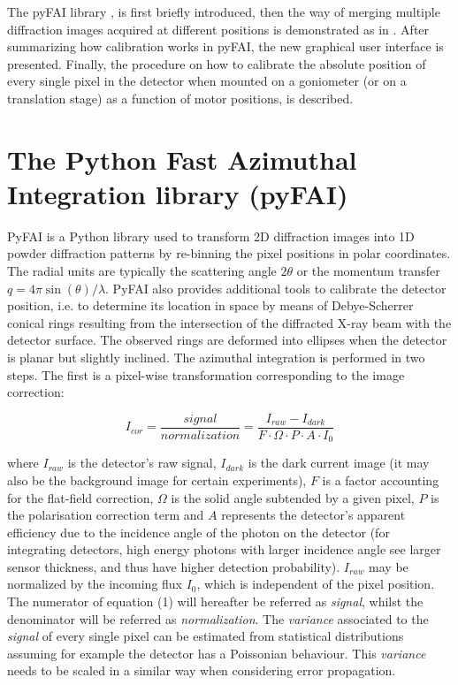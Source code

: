 \documentclass[preprint]{iucr}              %
\begin{document}
The pyFAI library \cite{fv5028}, is first briefly introduced, 
then the way of merging multiple diffraction images
acquired at different positions is demonstrated as in \cite{PyFAI_PDJ}. 
After summarizing how calibration works in pyFAI, the new graphical user
interface is presented.
Finally, the procedure on how to calibrate the absolute position of
every single pixel in the detector when mounted on a goniometer (or on a
translation stage) as a function of motor positions, is
described.

\section{The Python Fast Azimuthal Integration library (pyFAI)}

PyFAI is a Python \cite{python} library used to transform 2D diffraction images into
1D powder diffraction patterns by re-binning the pixel positions in polar
coordinates. 
The radial units are typically the scattering angle  
$2\theta$ or the momentum transfer $q=4\pi \sin(\theta)/\lambda$.
PyFAI also provides additional tools to calibrate the detector position, i.e.
to determine its location in space by means of Debye-Scherrer conical rings
resulting from the intersection of the diffracted X-ray beam with the
detector surface. 
The observed rings are deformed into ellipses when the detector is planar but 
slightly inclined. 
The azimuthal integration is performed in two steps. 
The first is a pixel-wise
transformation corresponding to the image correction:

\begin{equation}
I_{cor} = \frac{signal}{normalization}  = \frac{I_{raw} - I_{dark}}{F \cdot
\Omega \cdot P \cdot A \cdot I_0} 
\end{equation}

where $I_{raw}$ is the detector's raw signal, $I_{dark}$ is the dark current
image (it may also be the background image for certain experiments), $F$ is a 
factor accounting for the flat-field correction, $\Omega$ is the solid
angle subtended by a given pixel, $P$ is the polarisation correction term and
$A$ represents the detector's apparent efficiency due to the incidence angle of the
photon on the detector (for integrating detectors, high energy photons with
larger incidence angle see larger sensor thickness, and thus have higher
detection probability).
$I_{raw}$ may be normalized by the incoming flux $I_0$, which is
independent of the pixel position.
The numerator of equation (1) will hereafter be referred as
\textit{signal}, whilst the denominator will be referred as
\textit{normalization}. 
The \textit{variance} associated to the \textit{signal} of every single pixel can be estimated 
from statistical distributions assuming for example the detector has a Poissonian behaviour. 
This \textit{variance} needs to be scaled in a similar way when considering error propagation.
\end{document}

